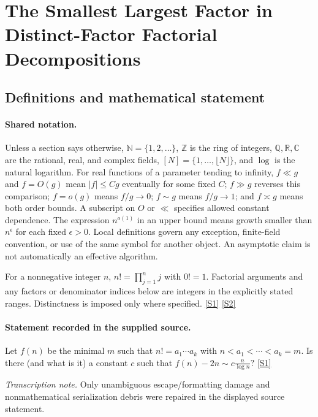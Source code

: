 \documentclass[11pt,a4paper]{article}
\newcommand{\N}{\mathbb{N}}
\newcommand{\Z}{\mathbb{Z}}
\newcommand{\Q}{\mathbb{Q}}
\newcommand{\R}{\mathbb{R}}
\newcommand{\C}{\mathbb{C}}
\newcommand{\sref}[2]{\hyperlink{source:#1:#2}{[S#2]}}
\begin{document}
\section{The Smallest Largest Factor in Distinct-Factor Factorial Decompositions}\label{statement}


\subsection{Definitions and mathematical statement}

\paragraph{Shared notation.}Unless a section says otherwise, $\N=\{1,2,\ldots\}$,
$\Z$ is the ring of integers, $\Q,\R,\C$ are the rational, real, and complex
fields, $[N]=\{1,\ldots,\lfloor N\rfloor\}$, and $\log$ is the natural
logarithm. For real functions of a parameter tending to infinity,
$f\ll g$ and $f=O(g)$ mean $|f|\leq Cg$ eventually for some fixed $C$;
$f\gg g$ reverses this comparison; $f=o(g)$ means $f/g\to0$;
$f\sim g$ means $f/g\to1$; and $f\asymp g$ means both order bounds.
A subscript on $O$ or $\ll$ specifies allowed constant dependence.
The expression $n^{o(1)}$ in an upper bound means growth smaller than
$n^\epsilon$ for each fixed $\epsilon>0$. Local definitions govern any
exception, finite-field convention, or use of the same symbol for another
object. An asymptotic claim is not automatically an effective algorithm.



For a nonnegative integer $n$, $n!=\prod_{j=1}^n j$ with $0!=1$. Factorial arguments and any factors or denominator indices below are integers in the explicitly stated ranges. Distinctness is imposed only where specified. \sref{statement}{1} \sref{statement}{2}

\paragraph{Statement recorded in the supplied source.}
Let $f(n)$ be the minimal $m$ such that $ n! = a_1\cdots a_k $ with $n< a_1<\cdots <a_k=m$. Is there (and what is it) a constant $c$ such that $ f(n)-2n \sim c\frac{n}{\log n}? $ \sref{statement}{1}

{\small\emph{Transcription note.} Only unambiguous escape/formatting damage and nonmathematical serialization debris were repaired in the displayed source statement.}
\end{document}
